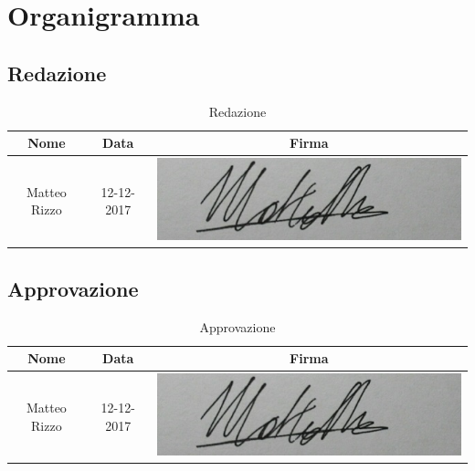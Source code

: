 \documentclass[./PianodiProgetto.tex]{subfiles}
\begin{document}
\chapter{Organigramma}

\section{Redazione}
\begin{table}[H]
	\centering
	\begin{tabular}{|c|c|c|}
		\hline
		Nome&Data&Firma \\ \hline
		Matteo Rizzo& 12-12-2017 &\includegraphics[scale=0.5]{img/firme/RizzoMatteo} \\
		\hline
	\end{tabular}
	\caption{Redazione}
\end{table}

\section{Approvazione}
\begin{table}[H]
	\centering
	\begin{tabular}{|c|c|c|}
		\hline
		Nome&Data&Firma \\ \hline
		Matteo Rizzo& 12-12-2017 & \includegraphics[scale=0.5]{img/firme/RizzoMatteo} \\
		\hline
	\end{tabular}
	\caption{Approvazione}
\end{table}
\end{document}
